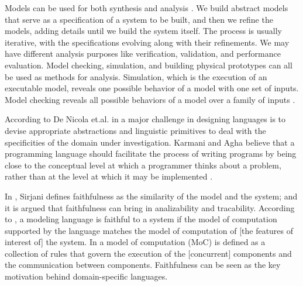 Models can be used for both synthesis and analysis \cite{DBLP:conf/facs2/LeeS18}. We build abstract models that serve as a specification of a system to be built, and then we refine the models, adding
details until we build the system itself. The process is usually iterative, with
the specifications evolving along with their refinements. We may have different analysis purposes like verification, validation, and performance evaluation. 
Model checking, simulation, and building physical prototypes can all be used as methods for analysis. Simulation, which is the execution of an executable
model, reveals one possible behavior of a model with one set of inputs. Model
checking reveals all possible behaviors of a model over a family of inputs \cite{DBLP:conf/facs2/LeeS18}.



According to De Nicola et.al. in \cite{DBLP:conf/coordination/NicolaFPT18} a major challenge in designing languages is to devise appropriate abstractions and linguistic primitives to deal with the specificities of the domain under investigation.
%
Karmani and Agha believe that a programming language should facilitate the process of writing programs by being close to the conceptual level at which a programmer thinks about a problem, rather than at the level at which it may be implemented \cite{DBLP:reference/parallel/KarmaniA11}. 

In \cite{DBLP:conf/birthday/FriendlinessSirjani18}, Sirjani defines faithfulness as the similarity of the
model and the system; and it is argued that faithfulness can bring in analizability and tracability. 
According to \cite{DBLP:conf/birthday/FriendlinessSirjani18}, a modeling
language is faithful to a system if the model of computation supported by the
language matches the model of computation of [the features of interest of] the
system. 
In \cite{Ptolemy:14:Book} a model of computation (MoC) is defined as a collection of rules that govern
the execution of the [concurrent] components and the communication between
components.
Faithfulness can be seen as the key motivation behind domain-specific
languages.


